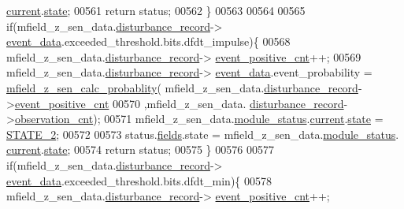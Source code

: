 \begin{DoxyCode}
      \hyperlink{a00019_acf41ffc11da291c2f9f0fcb02ee72b98}{current}.\hyperlink{a00019_a6b8d8e916bc56265a3fd279bd26b6d1b}{state};
00561                \textcolor{keywordflow}{return} status;
00562             \}
00563 
00564 
00565              \textcolor{keywordflow}{if}(mfield\_z\_sen\_data.\hyperlink{a00027_ac9b38e2c1d3f1013a88d33506c754152}{disturbance\_record}->
      \hyperlink{a00028_a8c0bda69e71ef674e60da47ad0be9ab0}{event\_data}.exceeded\_threshold.bits.dfdt\_impulse)\{
00568                mfield\_z\_sen\_data.\hyperlink{a00027_ac9b38e2c1d3f1013a88d33506c754152}{disturbance\_record}->
      \hyperlink{a00028_a7397b9d76d4b57500f27bb23d258a18a}{event\_positive\_cnt}++;
00569                mfield\_z\_sen\_data.\hyperlink{a00027_ac9b38e2c1d3f1013a88d33506c754152}{disturbance\_record}->
      \hyperlink{a00028_a8c0bda69e71ef674e60da47ad0be9ab0}{event\_data}.event\_probability = \hyperlink{a00053_a8a5c3986dbe778d199b6e3b485f7a34b}{mfield\_z\_sen\_calc\_probablity}(
      mfield\_z\_sen\_data.\hyperlink{a00027_ac9b38e2c1d3f1013a88d33506c754152}{disturbance\_record}->\hyperlink{a00028_a7397b9d76d4b57500f27bb23d258a18a}{event\_positive\_cnt}
00570                                                                                     ,mfield\_z\_sen\_data.
      \hyperlink{a00027_ac9b38e2c1d3f1013a88d33506c754152}{disturbance\_record}->\hyperlink{a00028_ad5b0bac02ce266b91b2b52a1c3ea1d78}{observation\_cnt});
00571                mfield\_z\_sen\_data.\hyperlink{a00027_adfab5a5d8b45a93dfb13edb24e2b80e3}{module\_status}.\hyperlink{a00019_acf41ffc11da291c2f9f0fcb02ee72b98}{current}.\hyperlink{a00019_a6b8d8e916bc56265a3fd279bd26b6d1b}{state} = 
      \hyperlink{a00021_a66fa48e832a64af4d405511cecc4c752}{STATE\_2};
00572 
00573                status.\hyperlink{a00021_a5296d090c085b0421fdf5a86e382abea}{fields}.state = mfield\_z\_sen\_data.\hyperlink{a00027_adfab5a5d8b45a93dfb13edb24e2b80e3}{module\_status}.
      \hyperlink{a00019_acf41ffc11da291c2f9f0fcb02ee72b98}{current}.\hyperlink{a00019_a6b8d8e916bc56265a3fd279bd26b6d1b}{state};
00574                \textcolor{keywordflow}{return} status;
00575              \}
00576 
00577              \textcolor{keywordflow}{if}(mfield\_z\_sen\_data.\hyperlink{a00027_ac9b38e2c1d3f1013a88d33506c754152}{disturbance\_record}->
      \hyperlink{a00028_a8c0bda69e71ef674e60da47ad0be9ab0}{event\_data}.exceeded\_threshold.bits.dfdt\_min)\{
00578                mfield\_z\_sen\_data.\hyperlink{a00027_ac9b38e2c1d3f1013a88d33506c754152}{disturbance\_record}->
      \hyperlink{a00028_a7397b9d76d4b57500f27bb23d258a18a}{event\_positive\_cnt}++;

\end{DoxyCode}
